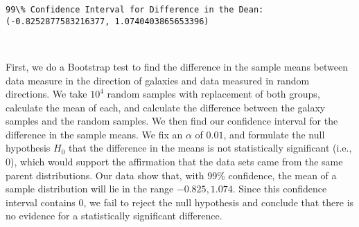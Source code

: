 \documentclass[11pt]{article}
\begin{document}
    \begin{Verbatim}[commandchars=\\\{\}]
99\% Confidence Interval for Difference in the Dean:	 (-0.8252877583216377, 1.0740403865653396)

    \end{Verbatim}

    \begin{center}
    \end{center}
    { \hspace*{\fill} \\}
    
    First, we do a Bootstrap test to find the difference in the sample means
between data measure in the direction of galaxies and data measured in
random directions. We take \(10^4\) random samples with replacement of
both groups, calculate the mean of each, and calculate the difference
between the galaxy samples and the random samples. We then find our
confidence interval for the difference in the sample means. We fix an
\(\alpha\) of \(0.01\), and formulate the null hypothesis \(H_0\) that
the difference in the means is not statistically significant (i.e.,
\(0\)), which would support the affirmation that the data sets came from
the same parent distributions. Our data show that, with 99\% confidence,
the mean of a sample distribution will lie in the range
\(-0.825, 1.074\). Since this confidence interval contains \(0\), we
fail to reject the null hypothesis and conclude that there is no
evidence for a statistically significant difference.
\end{document}
